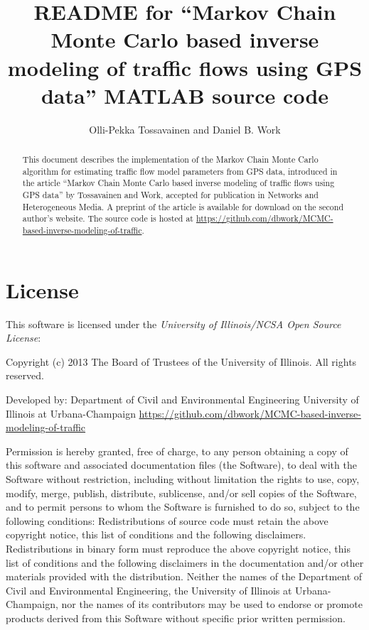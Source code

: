 \documentclass[english]{article}
\begin{document}
\title{README for ``Markov Chain Monte Carlo based inverse modeling of
traffic flows using GPS data'' MATLAB source code}


\author{Olli-Pekka Tossavainen and Daniel B. Work}
\maketitle
\begin{abstract}
This document describes the implementation of the Markov Chain Monte
Carlo algorithm for estimating traffic flow model parameters from
GPS data, introduced in the article ``Markov Chain Monte Carlo based
inverse modeling of traffic flows using GPS data'' by Tossavainen
and Work, accepted for publication in Networks and Heterogeneous Media.
A preprint of the article is available for download on the second
author's website. The source code is hosted at \url{https://github.com/dbwork/MCMC-based-inverse-modeling-of-traffic}.
\end{abstract}

\section{License}

This software is licensed under the \emph{University of Illinois/NCSA
Open Source License}:

\begin{center}
Copyright (c) 2013 The Board of Trustees of the University of Illinois.
All rights reserved.
\par\end{center}

\begin{center}
Developed by: Department of Civil and Environmental Engineering University
of Illinois at Urbana-Champaign \url{https://github.com/dbwork/MCMC-based-inverse-modeling-of-traffic}
\par\end{center}

Permission is hereby granted, free of charge, to any person obtaining
a copy of this software and associated documentation files (the \textquotedbl{}Software\textquotedbl{}),
to deal with the Software without restriction, including without limitation
the rights to use, copy, modify, merge, publish, distribute, sublicense,
and/or sell copies of the Software, and to permit persons to whom
the Software is furnished to do so, subject to the following conditions:
Redistributions of source code must retain the above copyright notice,
this list of conditions and the following disclaimers. Redistributions
in binary form must reproduce the above copyright notice, this list
of conditions and the following disclaimers in the documentation and/or
other materials provided with the distribution. Neither the names
of the Department of Civil and Environmental Engineering, the University
of Illinois at Urbana-Champaign, nor the names of its contributors
may be used to endorse or promote products derived from this Software
without specific prior written permission.
\end{document}

